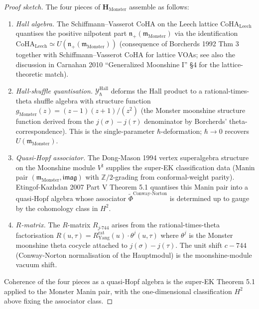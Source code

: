 \begin{proof}[Proof sketch]
The four pieces of $\mathbf H_{\mathrm{Monster}}$ assemble as follows:
\begin{enumerate}
\item \emph{Hall algebra.} The Schiffmann--Vasserot CoHA on the Leech
lattice $\mathrm{CoHA}_{\mathrm{Leech}}$ quantises the positive nilpotent
part $\mathfrak n_+(\mathfrak m_{\mathrm{Monster}})$ via the identification
$\mathrm{CoHA}_{\mathrm{Leech}} \simeq U(\mathfrak n_+(\mathfrak m_{\mathrm{Monster}}))$
(consequence of Borcherds 1992 Thm 3 together with Schiffmann--Vasserot
CoHA for lattice VOAs; see also the discussion in Carnahan 2010
``Generalized Moonshine I'' \S4 for the lattice-theoretic match).
\item \emph{Hall-shuffle quantisation.} $\mathcal Y^{\mathrm{Hall}}_\hbar$
deforms the Hall product to a rational-times-theta shuffle algebra with
structure function $g_{\mathrm{Monster}}(z) = (z - 1)(z + 1)/(z^2)$
(the Monster moonshine structure function derived from the
$j(\sigma)-j(\tau)$ denominator by Borcherds' theta-correspondence).
This is the single-parameter $\hbar$-deformation; $\hbar\to 0$ recovers
$U(\mathfrak m_{\mathrm{Monster}})$.
\item \emph{Quasi-Hopf associator.} The Dong-Mason 1994 vertex
superalgebra structure on the Moonshine module $V^\natural$ supplies the
super-EK classification data (Manin pair $(\mathfrak m_{\mathrm{Monster}},
\mathfrak{imag})$ with $\mathbb Z/2$-grading from conformal-weight
parity). Etingof-Kazhdan 2007 Part V Theorem 5.1 quantises this Manin
pair into a quasi-Hopf algebra whose associator
$\widetilde\Phi^{\mathrm{Conway\text{-}Norton}}$ is determined up to
gauge by the cohomology class in $H^2$.
\item \emph{$R$-matrix.} The $R$-matrix $R_{j\text{-}744}$ arises from
the rational-times-theta factorisation
$R(u,\tau) = R^{\mathrm{rat}}_{\mathrm{Yang}}(u)\cdot\theta^j(u,\tau)$
where $\theta^j$ is the Monster moonshine theta cocycle attached to
$j(\sigma)-j(\tau)$. The unit shift $c - 744$ (Conway-Norton
normalisation of the Hauptmodul) is the moonshine-module vacuum shift.
\end{enumerate}
Coherence of the four pieces as a quasi-Hopf algebra is the super-EK
Theorem 5.1 applied to the Monster Manin pair, with the one-dimensional
classification $H^2$ above fixing the associator class.
\end{proof}

